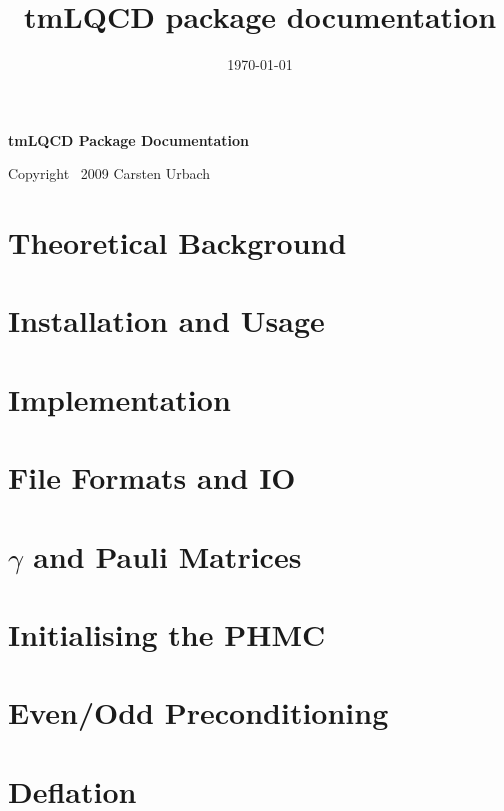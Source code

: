 \documentclass[a4paper,12pt,dvips]{article}
\date{\today}
\title{tmLQCD package documentation}
\begin{document}
\begin{center}
  {\Large\bf tmLQCD Package Documentation}\\
\end{center}

\tableofcontents

\begin{flushright}
  Copyright \textcopyright\ 2009 Carsten Urbach
\end{flushright}

\section{Theoretical Background}


\section{Installation and Usage}


\section{Implementation}




\section{File Formats and IO}

\clearpage


\clearpage

\begin{appendix}
  \section{$\gamma$  and Pauli  Matrices}

  \section{Initialising the PHMC}
  \section{Even/Odd Preconditioning}
  \section{Deflation}
\end{appendix}
\end{document}
